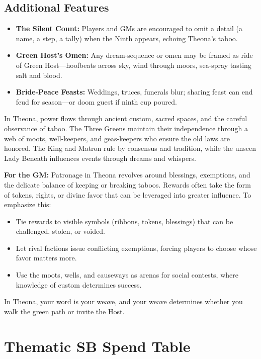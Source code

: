 \subsection*{Additional Features}
\begin{itemize}
\item \textbf{The Silent Count:} Players and GMs are encouraged to omit a detail (a name, a step, a tally) when the Ninth appears, echoing Theona's taboo.
\item \textbf{Green Host's Omen:} Any dream-sequence or omen may be framed as ride of Green Host---hoofbeats across sky, wind through moors, sea-spray tasting salt and blood.
\item \textbf{Bride-Peace Feasts:} Weddings, truces, funerals blur; sharing feast can end feud for season---or doom guest if ninth cup poured.
\end{itemize}

\begin{tcolorbox}[colback=black!3,colframe=black!40!white,title={Patronage \& Power}]
In Theona, power flows through ancient custom, sacred spaces, and the careful observance of taboo. The Three Greens maintain their independence through a web of moots, well-keepers, and geas-keepers who ensure the old laws are honored. The King and Matron rule by consensus and tradition, while the unseen Lady Beneath influences events through dreams and whispers.

\textbf{For the GM:}  
Patronage in Theona revolves around blessings, exemptions, and the delicate balance of keeping or breaking taboos. Rewards often take the form of tokens, rights, or divine favor that can be leveraged into greater influence. To emphasize this:
\begin{itemize}
\item Tie rewards to visible symbols (ribbons, tokens, blessings) that can be challenged, stolen, or voided.
\item Let rival factions issue conflicting exemptions, forcing players to choose whose favor matters more.
\item Use the moots, wells, and causeways as arenas for social contests, where knowledge of custom determines success.
\end{itemize}
In Theona, your word is your weave, and your weave determines whether you walk the green path or invite the Host.
\end{tcolorbox}

\section*{Thematic SB Spend Table}
\label{sec:theona-sb}


